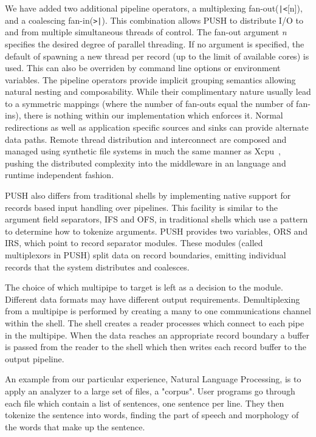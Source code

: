 \documentclass[11pt, letterpaper]{article}
\begin{document}
We have added two additional pipeline operators, 
a multiplexing fan-out(\verb!|<![n]), and a coalescing fan-in(\verb!>|!). 
This combination allows PUSH to distribute I/O to and from multiple
simultaneous threads of control.
The fan-out argument \emph{n} specifies the desired degree of parallel 
threading.  If no argument is specified, the default of spawning a new
thread per record (up to the limit of available cores) is used.  This can
also be overriden by command line options or environment variables.
The pipeline operators provide implicit grouping semantics allowing natural 
nesting and composability.
While their complimentary nature usually lead to a symmetric
mappings (where the number of fan-outs equal the number of fan-ins), there is 
nothing within our implementation which enforces it.
Normal redirections as well as application specific sources and sinks 
can provide alternate data paths.
Remote thread distribution and interconnect are composed and managed
using synthetic file systems in much the same manner as Xcpu~\cite{xcpu}, 
pushing the distributed complexity into the middleware in an language and 
runtime independent fashion.

PUSH also differs from traditional shells by implementing native support for 
records based input handling over pipelines. This facility is similar to the 
argument field separators, IFS and OFS, in traditional shells which use a 
pattern to determine how to tokenize arguments. PUSH provides two variables, 
ORS and IRS, which point to record separator modules. These modules 
(called multiplexors in PUSH) split data on record boundaries, emitting 
individual records that the system distributes and coalesces. 

The choice of which multipipe to target is left as a decision to the module. 
Different data formats may have different output requirements. 
Demultiplexing from a multipipe is performed by creating a many to one 
communications channel within the shell. The shell creates a reader processes 
which connect to each pipe in the multipipe. When the data reaches an 
appropriate record boundary a buffer is passed from the reader to the shell 
which then writes each record buffer to the output pipeline. 

An example from our particular experience, Natural Language Processing, is 
to apply an analyzer to a large set of files, a "corpus". User programs go 
through each file which contain a list of sentences, one sentence per line. 
They then tokenize the sentence into words, finding the part of speech and 
morphology of the words that make up the sentence.
\end{document}

